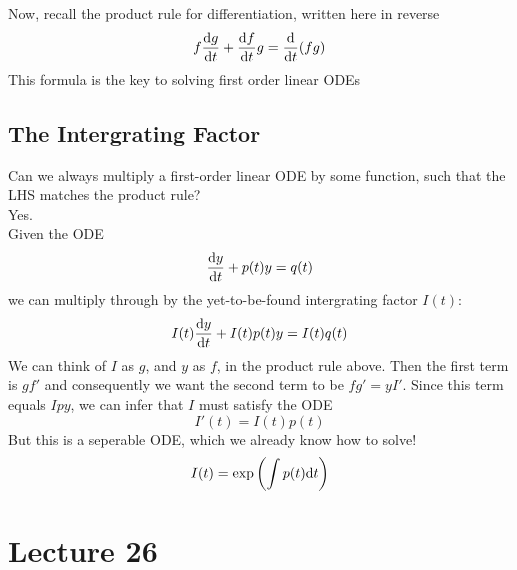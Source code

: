 \documentclass{report}
\begin{document}
Now, recall the product rule for differentiation, written here in reverse
$$
	f\dyd[g]{t} + \dyd[f]{t}g = \dd{t}(fg)
$$
This formula is the key to solving first order linear ODEs


\subsection*{The Intergrating Factor}
Can we always multiply a first-order linear ODE by some function, such that the LHS matches the product rule? \\

Yes. \\

Given the ODE
$$
	\dyd{t} + p(t)y = q(t)
$$
we can multiply through by the yet-to-be-found intergrating factor $I(t)$:
$$
	I(t)\dyd{t} + I(t)p(t)y = I(t)q(t)
$$
We can think of $I$ as $g$, and $y$ as $f$, in the product rule above. Then the first term is $gf'$ and consequently we want the second term to be $fg' = yI'$. Since this term equals $Ipy$, we can infer that $I$ must satisfy the ODE
$$
	I'(t) = I(t)p(t)
$$
But this is a seperable ODE, which we already know how to solve!
$$
	I(t) = \exp\bracks{\int p(t)\d t}
$$

\section{Lecture 26}
\end{document}
